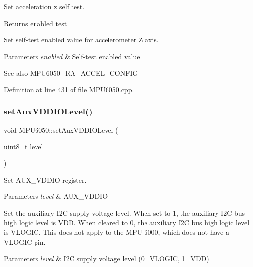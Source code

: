 Set acceleration z self test.

\begin{DoxyReturn}{Returns}
enabled test
\end{DoxyReturn}
Set self-\/test enabled value for accelerometer Z axis. 
\begin{DoxyParams}{Parameters}
{\em enabled} & Self-\/test enabled value \\
\hline
\end{DoxyParams}
\begin{DoxySeeAlso}{See also}
\mbox{\hyperlink{MPU6050_8h_a48b7d7b24a70b247e373bc5965a5dcc7}{M\+P\+U6050\+\_\+\+R\+A\+\_\+\+A\+C\+C\+E\+L\+\_\+\+C\+O\+N\+F\+IG}} 
\end{DoxySeeAlso}


Definition at line 431 of file M\+P\+U6050.\+cpp.


\begin{DoxyCode}{0}

\end{DoxyCode}
\mbox{\label{classMPU6050_a7c666c20e26869bc80646f1b2c3d69bc}} 
\subsubsection{\texorpdfstring{setAuxVDDIOLevel()}{setAuxVDDIOLevel()}}
{\footnotesize\ttfamily void M\+P\+U6050\+::set\+Aux\+V\+D\+D\+I\+O\+Level (\begin{DoxyParamCaption}\item[{uint8\+\_\+t}]{level }\end{DoxyParamCaption})}

Set A\+U\+X\+\_\+\+V\+D\+D\+IO register.


\begin{DoxyParams}{Parameters}
{\em level} & A\+U\+X\+\_\+\+V\+D\+D\+IO\\
\hline
\end{DoxyParams}
Set the auxiliary I2C supply voltage level. When set to 1, the auxiliary I2C bus high logic level is V\+DD. When cleared to 0, the auxiliary I2C bus high logic level is V\+L\+O\+G\+IC. This does not apply to the M\+P\+U-\/6000, which does not have a V\+L\+O\+G\+IC pin. 
\begin{DoxyParams}{Parameters}
{\em level} & I2C supply voltage level (0=V\+L\+O\+G\+IC, 1=V\+DD) \\
\hline
\end{DoxyParams}


